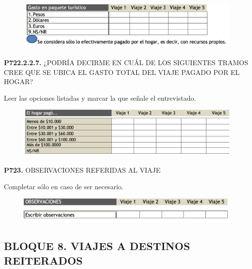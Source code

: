 \documentclass[
  openany]{book}
\begin{document}
\begin{figure}

{\centering \includegraphics[width=1\linewidth]{imagenes/figura6-250} 

}

\end{figure}

\textbf{P722.2.2.7.} ¿PODRÍA DECIRME EN CUÁL DE LOS SIGUIENTES TRAMOS CREE QUE SE UBICA EL GASTO TOTAL DEL VIAJE PAGADO POR EL HOGAR?

Leer las opciones listadas y marcar la que señale el entrevistado.

\begin{figure}

{\centering \includegraphics[width=1\linewidth]{imagenes/figura6-251} 

}

\end{figure}

\textbf{P723.} OBSERVACIONES REFERIDAS AL VIAJE

Completar sólo en caso de ser necesario.

\begin{figure}

{\centering \includegraphics[width=1\linewidth]{imagenes/figura6-252} 

}

\end{figure}

\hypertarget{bloque-8.-viajes-a-destinos-reiterados}{%
\subsection{\texorpdfstring{\textbf{BLOQUE 8. VIAJES A DESTINOS REITERADOS}}{BLOQUE 8. VIAJES A DESTINOS REITERADOS}}\label{bloque-8.-viajes-a-destinos-reiterados}}
\end{document}

